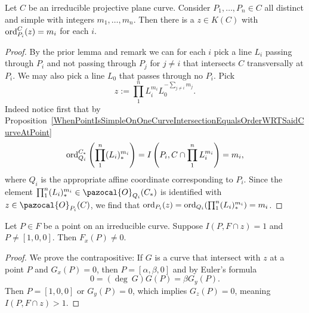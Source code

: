     \begin{lemma}\label{ExistenceOfRationalFunctionWithSpecificOrderAtSpecificPoints}
        Let $C$ be an irreducible projective plane curve. Consider $P_1,\dots, P_n\in C$ all distinct and simple with integers $m_1,\dots,m_n$. Then there is a $z\in K(C)$ with $\mathrm{ord}^C_{P_i}(z)=m_i$ for each $i$.
    \end{lemma}
    \begin{proof}
        By the prior lemma and remark we can for each $i$ pick a line $L_i$ passing through $P_i$ and not passing through $P_j$ for  $j\neq i$ that intersects $C$ transversally at $P_i$. We may also pick a line $L_0$ that passes through no $P_i$. Pick
        $$z := \prod_1^n L_i^{m_i}L_0^{-\sum_{j\neq i} m_j}.$$
        Indeed notice first that by Proposition~\ref{WhenPointIsSimpleOnOneCurveIntersectionEqualsOrderWRTSaidCurveAtPoint}
        $$\mathrm{ord}^{C_\ast}_{Q_i}\left(\prod_1^n (L_i)_\ast^{m_i}\right)=I\left(P_i,C\cap \prod_1^n L_i^{m_i}\right) = m_i,$$
        where $Q_i$ is the appropriate affine coordinate corresponding to $P_i$. Since the element $\prod_1^n (L_i)_\ast^{m_i}\in \pazocal{O}_{Q_i}(C_\ast)$ is identified with $z\in \pazocal{O}_{P_i}(C)$, we find that
        $\mathrm{ord}_{P_i}(z)=\mathrm{ord}_{Q_i}(\prod_1^n (L_i)_\ast^{m_i})=m_i$.
    \end{proof}
    \begin{lemma}\label{TechnicalNonVanishingLemmaOfPartialDerivativeUsedForCanonicalDivisor}
        Let $P\in F$ be a point on an irreducible curve. Suppose $I(P,F\cap z)=1$ and $P\neq [1,0,0]$. Then $F_x(P)\neq 0$.
    \end{lemma}
    \begin{proof}
        We prove the contrapositive: If $G$ is a curve that intersect with $z$ at a point $P$ and $G_x(P)=0$, then $P= [\alpha,\beta, 0]$ and by Euler's formula  
        $$0 = (\deg \ G)G(P)= \beta G_y(P).$$
        Then $P = [1,0,0]$ or $G_y(P) = 0$, which implies $G_z(P) = 0$, meaning $I(P,F\cap z)>1$. 
    \end{proof}
